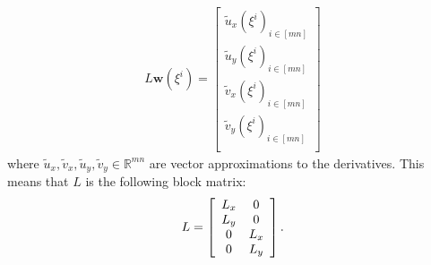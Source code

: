 \begin{align*}
L \textbf{w}(\xi^i) = \begin{bmatrix}
         \tilde{u}_x(\xi^i)_{i\in [mn]}  \\
         \tilde{u}_y(\xi^i)_{i\in [mn]}  \\
         \tilde{v}_x(\xi^i)_{i\in [mn]} \\
         \tilde{v}_y (\xi^i)_{i\in [mn]} \\
        \end{bmatrix}
\end{align*}
where $\tilde{u}_x, \tilde{v}_x, \tilde{u}_y, \tilde{v}_y \in \mathbb{R}^{mn}$ are vector approximations to the derivatives. This means that $L$ is the following  block matrix:
\begin{align*}
L = \left[
\begin{array}{c c}
L_x & 0 \\
L_y & 0\\
0 & L_x \\
0 & L_y \\
\end{array}
\right].
\end{align*}

